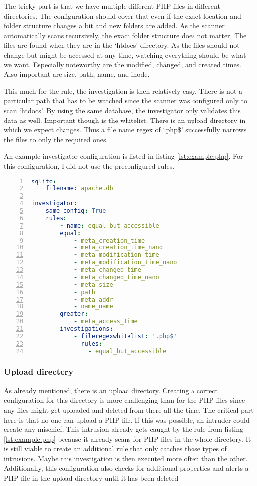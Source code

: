 The tricky part is that we have multiple different PHP files in different directories. The configuration should cover that even if the exact location and folder structure changes a bit and new folders are added. As the scanner automatically scans recursively, the exact folder structure does not matter. The files are found when they are in the `htdocs' directory. As the files should not change but might be accessed at any time, watching everything should be what we want. Especially noteworthy are the modified, changed, and created times. Also important are size, path, name, and inode.

This much for the rule, the investigation is then relatively easy. There is not a particular path that has to be watched since the scanner was configured only to scan `htdocs'. By using the same database, the investigator only validates this data as well. Important though is the whitelist. There is an upload directory in which we expect changes. Thus a file name regex of `.php\$' successfully narrows the files to only the required ones.

An example investigator configuration is listed in listing \ref{lst:example:php}. For this configuration, I did not use the preconfigured rules.


\begin{lstlisting}[language=yaml, numbers=left, caption=Example PHP File Configuration, label=lst:example:php]
sqlite:
    filename: apache.db

investigator:
    same_config: True
    rules: 
        - name: equal_but_accessible
        equal:
            - meta_creation_time
            - meta_creation_time_nano
            - meta_modification_time
            - meta_modification_time_nano
            - meta_changed_time
            - meta_changed_time_nano
            - meta_size
            - path
            - meta_addr
            - name_name
        greater:
            - meta_access_time
        investigations:
            - fileregexwhitelist: '.php$'
              rules:
                - equal_but_accessible
\end{lstlisting}

\subsubsection{Upload directory}

As already mentioned, there is an upload directory. Creating a correct configuration for this directory is more challenging than for the PHP files since any files might get uploaded and deleted from there all the time. The critical part here is that no one can upload a PHP file. If this was possible, an intruder could create any mischief. This intrusion already gets caught by the rule from listing \ref{lst:example:php} because it already scans for PHP files in the whole directory. It is still viable to create an additional rule that only catches those types of intrusions. Maybe this investigation is then executed more often than the other. Additionally, this configuration also checks for additional properties and alerts a PHP file in the upload directory until it has been deleted

